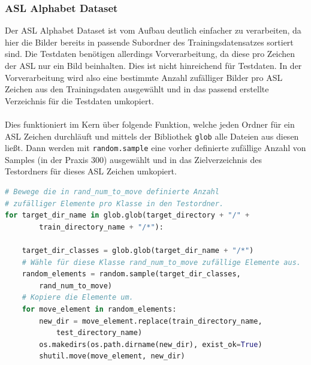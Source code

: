 \documentclass[11pt,bibliography=totocnumbered]{scrartcl}
\begin{document}
\subsubsection{ASL Alphabet Dataset}
Der ASL Alphabet Dataset ist vom Aufbau deutlich einfacher zu verarbeiten, da hier die Bilder bereits in passende Subordner des Trainingsdatensatzes sortiert sind. Die Testdaten benötigen allerdings Vorverarbeitung, da diese pro Zeichen der ASL nur ein Bild beinhalten. Dies ist nicht hinreichend für Testdaten. In der Vorverarbeitung wird also eine bestimmte Anzahl zufälliger Bilder pro ASL Zeichen aus den Trainingsdaten ausgewählt und in das passend erstellte Verzeichnis für die Testdaten umkopiert.
\\\\
Dies funktioniert im Kern über folgende Funktion, welche jeden Ordner für ein ASL Zeichen durchläuft und mittels der Bibliothek \lstinline[language=pythoninline]|glob| alle Dateien aus diesen ließt. Dann werden mit \lstinline[language=pythoninline]|random.sample| eine vorher definierte zufällige Anzahl von Samples (in der Praxis 300) ausgewählt und in das Zielverzeichnis des Testordners für dieses ASL Zeichen umkopiert.
\begin{lstlisting}[language=python,firstnumber=44,caption={Kern der Sign Language MNIST Dataset Vorverarbeitung.},label=lst:to_image_at_dir]
# Bewege die in rand_num_to_move definierte Anzahl 
# zufälliger Elemente pro Klasse in den Testordner.
for target_dir_name in glob.glob(target_directory + "/" + 
		train_directory_name + "/*"):
	
	target_dir_classes = glob.glob(target_dir_name + "/*")
	# Wähle für diese Klasse rand_num_to_move zufällige Elemente aus.
	random_elements = random.sample(target_dir_classes, 
		rand_num_to_move)
	# Kopiere die Elemente um.
	for move_element in random_elements:
		new_dir = move_element.replace(train_directory_name, 
			test_directory_name)
		os.makedirs(os.path.dirname(new_dir), exist_ok=True)
		shutil.move(move_element, new_dir)
\end{lstlisting}
\end{document}

